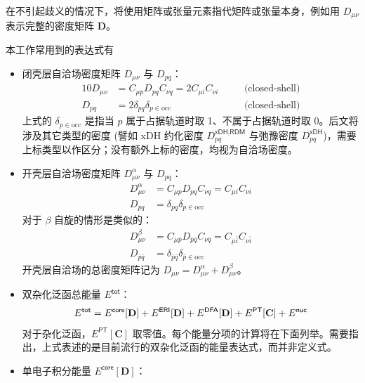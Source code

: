 在不引起歧义的情况下，将使用矩阵或张量元素指代矩阵或张量本身，例如用 $D_{\mu \nu}$ 表示完整的密度矩阵 $\mathbf{D}$。

本工作常用到的表达式有
\begin{itemize}[nosep]
  \item 闭壳层自洽场密度矩阵 $D_{\mu \nu}$ 与 $D_{pq}$：
        \begin{alignat}{10}
          D_{\mu \nu} &= C_{\mu p} D_{pq} C_{\nu q} = 2 C_{\mu i} C_{\nu i} \quad &&\text{(closed-shell)} \\
          D_{pq} &= 2 \delta_{pq} \delta_{p \in \mathrm{occ}} \quad &&\text{(closed-shell)}
        \end{alignat}
        上式的 $\delta_{p \in \mathrm{occ}}$ 是指当 $p$ 属于占据轨道时取 1、不属于占据轨道时取 0。后文将涉及其它类型的密度 (譬如 xDH 约化密度 $D_{pq}^{\textsf{xDH}, \textsf{RDM}}$ 与弛豫密度 $D_{pq}^{\textsf{xDH}}$)，需要上标类型以作区分；没有额外上标的密度，均视为自洽场密度。
  \item 开壳层自洽场密度矩阵 $D_{\mu \nu}^\alpha$ 与 $D_{pq}$：
        \begin{align}
          D_{\mu \nu}^\alpha &= C_{\mu p} D_{pq} C_{\nu q} = C_{\mu i} C_{\nu i} \\
          D_{pq} &= \delta_{pq} \delta_{p \in \mathrm{occ}}
        \end{align}
        对于 $\beta$ 自旋的情形是类似的：
        \begin{align}
          D_{\mu \nu}^\beta &= C_{\mu \bar p} D_{\bar p \bar q} C_{\nu \bar q} = C_{\mu \bar i} C_{\nu \bar i} \\
          D_{\bar p \bar q} &= \delta_{\bar p \bar q} \delta_{\bar p \in \mathrm{occ}}
        \end{align}
        开壳层自洽场的总密度矩阵记为 $D_{\mu \nu} = D_{\mu \nu}^\alpha + D_{\mu \nu}^\beta$。
  \item 双杂化泛函总能量 $E^\textsf{tot}$：
        \begin{equation}
          \label{eq.def-E-tot}
          E^\textsf{tot} = E^\textsf{core} [\mathbf{D}] + E^\textsf{ERI} [\mathbf{D}] + E^\textsf{DFA} [\mathbf{D}] + E^\textsf{PT} [\mathbf{C}] + E^\textsf{nuc} \\
        \end{equation}
        对于杂化泛函，$E^\textsf{PT} [\mathbf{C}]$ 取零值。每个能量分项的计算将在下面列举。需要指出，上式表述的是目前流行的双杂化泛函的能量表达式，而并非定义式。
  \item 单电子积分能量 $E^\textsf{core} [\mathbf{D}]$：

\end{itemize}
